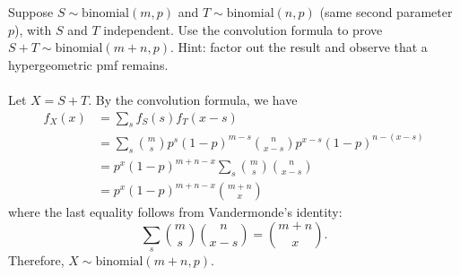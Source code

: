 \documentclass[12pt]{article}
\newenvironment{problem}[2][Problem]{\begin{trivlist}
\item[\hskip \labelsep {\bfseries #1}\hskip \labelsep {\bfseries #2.}]}
{\end{trivlist}}
\begin{document}
\begin{problem}{4}
  Suppose $S \sim \text{binomial}(m, p)$ and 
  $T \sim \text{binomial}(n, p)$ (same second parameter $p$), with $S$ and
  $T$ independent. Use the convolution formula to prove
  $S + T \sim \text{binomial}(m + n, p)$. Hint: factor out the 
  result and observe that a hypergeometric pmf remains.
  \\\\
  Let $X = S + T$. By the convolution formula, we have
  \begin{align*}
    f_X (x) &= \sum_s
    f_S (s) f_T (x - s) \\
    &= \sum_{s}
    \binom{m}{s} p^s (1-p)^{m-s} 
    \binom{n}{x-s} p^{x-s} (1-p)^{n-(x-s)} \\
    &= p^x (1-p)^{m+n-x} 
    \sum_{s}
    \binom{m}{s} \binom{n}{x-s} \\
    &= p^x (1-p)^{m+n-x} \binom{m+n}{x}
  \end{align*}
  where the last equality follows from Vandermonde's identity:
  \[
    \sum_{s}
    \binom{m}{s} \binom{n}{x-s} = \binom{m+n}{x}.
  \]
  Therefore, $X \sim \text{binomial}(m + n, p)$.
\end{problem}
\end{document}

